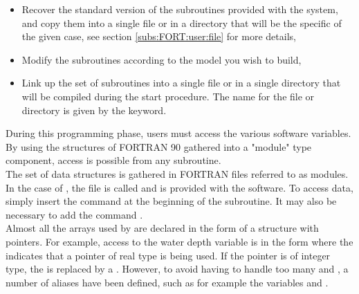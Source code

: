 \begin{itemize}
\item Recover the standard version of the subroutines provided with the system,
and copy them into a single file or in a directory that will be the specific
 of the given case, see section \ref{subs:FORT:user:file}
for more details,

\item Modify the subroutines according to the model you wish to build,

\item Link up the set of subroutines into a single file or in a single directory
that will be compiled during the  start procedure.
The name for the file or directory is given by the  keyword.
\end{itemize}

During this programming phase, users must access the various software variables.
By using the structures of FORTRAN 90 gathered into a "module" type component,
access is possible from any subroutine.\\

The set of data structures is gathered in FORTRAN files referred to as modules.
In the case of , the file is called 
and is provided with the software.
To access  data, simply insert the command
 at the beginning of the subroutine.
It may also be necessary to add the command .\\

Almost all the arrays used by  are declared in the form of
a structure with pointers.
For example, access to the water depth variable is in the form 
where the  indicates that a pointer of real type is being used.
If the pointer is of integer type, the  is replaced by a
.
However, to avoid having to handle too many  and ,
a number of aliases have been defined, such as for example the variables
 and .

